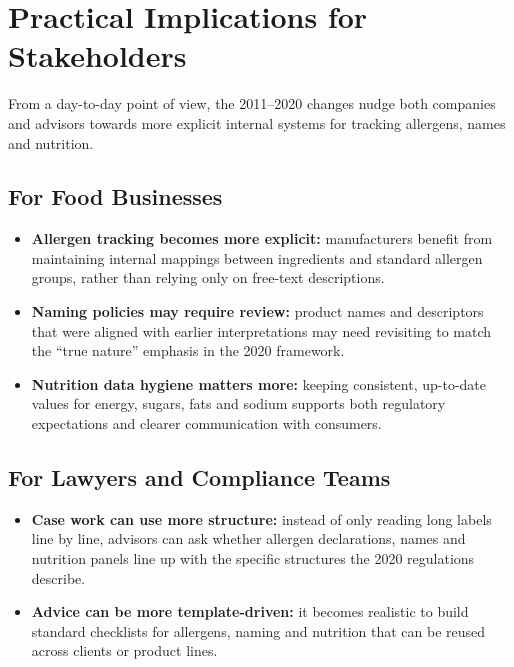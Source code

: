 \documentclass[12pt,a4paper]{article}
\begin{document}
\section{Practical Implications for Stakeholders}

From a day-to-day point of view, the 2011--2020 changes nudge both companies and advisors towards more explicit internal systems for tracking allergens, names and nutrition.

\subsection{For Food Businesses}

\begin{itemize}
  \item \textbf{Allergen tracking becomes more explicit:} manufacturers benefit from maintaining internal mappings between ingredients and standard allergen groups, rather than relying only on free-text descriptions.
  \item \textbf{Naming policies may require review:} product names and descriptors that were aligned with earlier interpretations may need revisiting to match the ``true nature'' emphasis in the 2020 framework.
  \item \textbf{Nutrition data hygiene matters more:} keeping consistent, up-to-date values for energy, sugars, fats and sodium supports both regulatory expectations and clearer communication with consumers.
\end{itemize}

\subsection{For Lawyers and Compliance Teams}

\begin{itemize}
  \item \textbf{Case work can use more structure:} instead of only reading long labels line by line, advisors can ask whether allergen declarations, names and nutrition panels line up with the specific structures the 2020 regulations describe.
  \item \textbf{Advice can be more template-driven:} it becomes realistic to build standard checklists for allergens, naming and nutrition that can be reused across clients or product lines.
\end{itemize}
\end{document}
